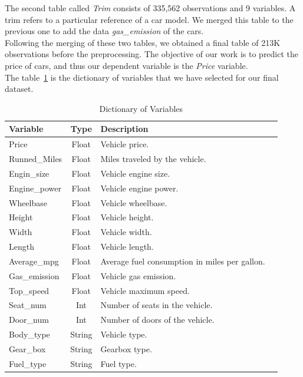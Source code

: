 \documentclass[12pt]{article}
\begin{document}
\noindent The second table called \textit{Trim} consists of 335,562 observations and 9 variables. A trim refers to a particular reference of a car model. We merged this table to the previous one to add the data \textit{gas\_emission} of the cars.\\

\noindent Following the merging of these two tables, we obtained a final table of 213K observations before the preprocessing. The objective of our work is to predict the price of cars, and thus our dependent variable is the \textit{Price} variable.\\

\noindent The table~\ref{variables} is the dictionary of variables that we have selected for our final dataset.\\

\begin{table}[ht]
    \centering
    \caption{Dictionary of Variables}
    \label{variables}
    \begin{tabularx}{\textwidth}{lclX}
        \toprule
        \textbf{Variable} & \textbf{Type} & \textbf{Description} \\
        \midrule
        Price & Float & Vehicle price. \\
        Runned\_Miles & Float & Miles traveled by the vehicle. \\
        Engin\_size & Float & Vehicle engine size. \\
        Engine\_power & Float & Vehicle engine power. \\
        Wheelbase & Float & Vehicle wheelbase. \\
        Height & Float & Vehicle height. \\
        Width & Float & Vehicle width. \\
        Length & Float & Vehicle length. \\
        Average\_mpg & Float & Average fuel consumption in miles per gallon. \\
        Gas\_emission & Float & Vehicle gas emission. \\
        Top\_speed & Float & Vehicle maximum speed. \\
        Seat\_num & Int & Number of seats in the vehicle. \\
        Door\_num & Int & Number of doors of the vehicle. \\
        Body\_type & String & Vehicle type. \\
        Gear\_box & String & Gearbox type. \\
        Fuel\_type & String & Fuel type. \\
        \bottomrule
    \end{tabularx}
\end{table} 
\end{document}
